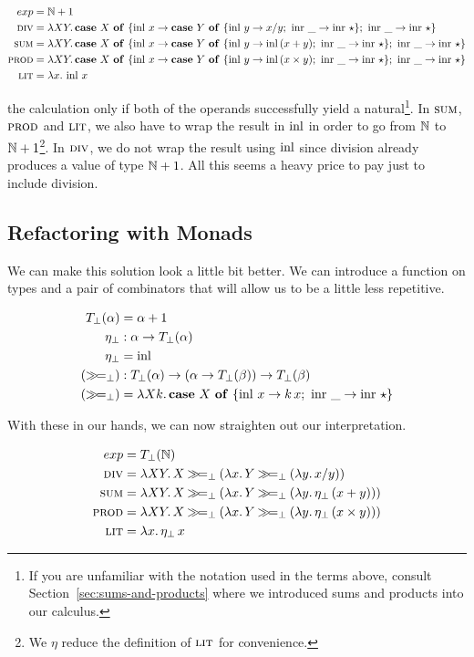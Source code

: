 \begin{align*}
  exp &= \mathbb{N} + 1 \\
  \textsc{div} &= \lambda X Y.\, \text{\textbf{case} $X$ \textbf{of} $\{ \operatorname{inl}\,x \to \text{\textbf{case} $Y$ \textbf{of} $\{ \operatorname{inl}\,y \to x / y;\ \operatorname{inr}\,\_ \to \operatorname{inr}\,\star \}$};\ \operatorname{inr}\,\_ \to \operatorname{inr}\,\star \}$} \\ 
  \textsc{sum} &= \lambda X Y.\, \text{\textbf{case} $X$ \textbf{of} $\{ \operatorname{inl}\,x \to \text{\textbf{case} $Y$ \textbf{of} $\{ \operatorname{inl}\,y \to \operatorname{inl}\,(x + y);\ \operatorname{inr}\,\_ \to \operatorname{inr}\,\star \}$};\ \operatorname{inr}\,\_ \to \operatorname{inr}\,\star \}$} \\ 
  \textsc{prod} &= \lambda X Y.\, \text{\textbf{case} $X$ \textbf{of} $\{ \operatorname{inl}\,x \to \text{\textbf{case} $Y$ \textbf{of} $\{ \operatorname{inl}\,y \to \operatorname{inl}\,(x \times y);\ \operatorname{inr}\,\_ \to \operatorname{inr}\,\star \}$};\ \operatorname{inr}\,\_ \to \operatorname{inr}\,\star \}$} \\ 
  \textsc{lit} &= \lambda x.\, \operatorname{inl}\,x
\end{align*}


the calculation only if both of the operands successfully yield a
natural\footnote{If you are unfamiliar with the notation used in the terms
  above, consult Section~\ref{sec:sums-and-products} where we introduced
  sums and products into our calculus.}. In $\textsc{sum}$, $\textsc{prod}$ and $\textsc{lit}$,
we also have to wrap the result in $\operatorname{inl}$ in order to go from $\mathbb{N}$ to $\mathbb{N}
+ 1$\footnote{We $\eta$ reduce the definition of $\textsc{lit}$ for
  convenience.}. In $\textsc{div}$, we do not wrap the result using $\operatorname{inl}$ since
division already produces a value of type $\mathbb{N} + 1$. All this seems a heavy
price to pay just to include division.

\subsection{Refactoring with Monads}
\label{ssec:refactoring-with-monads}

We can make this solution look a little bit better. We can introduce a
function on types and a pair of combinators that will allow us to be a
little less repetitive.

\begin{align*}
  T_\bot(\alpha) &= \alpha + 1 \\
  \eta_\bot &: \alpha \to T_\bot(\alpha) \\
  \eta_\bot &= \operatorname{inl} \\
  (\mathbin{\gg\!=}_\bot) &: T_\bot(\alpha) \to (\alpha \to T_\bot(\beta)) \to T_\bot(\beta) \\
  (\mathbin{\gg\!=}_\bot) &= \lambda X k.\, \text{\textbf{case} $X$ \textbf{of} $\{ \operatorname{inl}\,x \to k\,x;\ \operatorname{inr}\,\_ \to \operatorname{inr}\,\star \}$}
\end{align*}

With these in our hands, we can now straighten out our interpretation.

\begin{align*}
  exp &= T_\bot(\mathbb{N}) \\
  \textsc{div} &= \lambda X Y.\, X \mathbin{\gg\!=}_\bot (\lambda x.\, Y \mathbin{\gg\!=}_\bot (\lambda y.\, x / y)) \\
  \textsc{sum} &= \lambda X Y.\, X \mathbin{\gg\!=}_\bot (\lambda x.\, Y \mathbin{\gg\!=}_\bot (\lambda y.\, \eta_\bot\,(x + y))) \\
  \textsc{prod} &= \lambda X Y.\, X \mathbin{\gg\!=}_\bot (\lambda x.\, Y \mathbin{\gg\!=}_\bot (\lambda y.\, \eta_\bot\,(x \times y))) \\
  \textsc{lit} &= \lambda x.\, \eta_\bot\,x
\end{align*}


